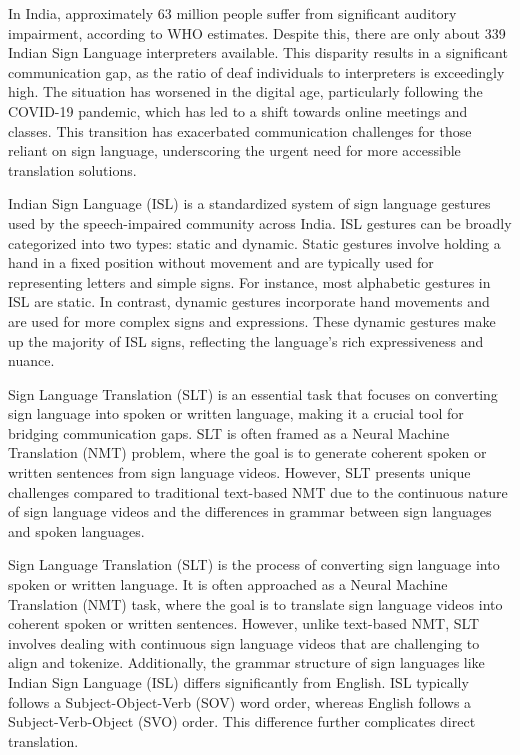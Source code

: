 \documentclass[conference]{IEEEtran}
\begin{document}
In India, approximately 63 million people suffer from significant auditory impairment, according to WHO estimates. Despite this, there are only about 339 Indian Sign Language interpreters available. This disparity results in a significant communication gap, as the ratio of deaf individuals to interpreters is exceedingly high. The situation has worsened in the digital age, particularly following the COVID-19 pandemic, which has led to a shift towards online meetings and classes. This transition has exacerbated communication challenges for those reliant on sign language, underscoring the urgent need for more accessible translation solutions.

Indian Sign Language (ISL) is a standardized system of sign language gestures used by the speech-impaired community across India. ISL gestures can be broadly categorized into two types: static and dynamic. Static gestures involve holding a hand in a fixed position without movement and are typically used for representing letters and simple signs. For instance, most alphabetic gestures in ISL are static. In contrast, dynamic gestures incorporate hand movements and are used for more complex signs and expressions. These dynamic gestures make up the majority of ISL signs, reflecting the language's rich expressiveness and nuance.

Sign Language Translation (SLT) is an essential task that focuses on converting sign language into spoken or written language, making it a crucial tool for bridging communication gaps. SLT is often framed as a Neural Machine Translation (NMT) problem, where the goal is to generate coherent spoken or written sentences from sign language videos. However, SLT presents unique challenges compared to traditional text-based NMT due to the continuous nature of sign language videos and the differences in grammar between sign languages and spoken languages.

Sign Language Translation (SLT) is the process of converting sign language into spoken or written language. It is often approached as a Neural Machine Translation (NMT) task, where the goal is to translate sign language videos into coherent spoken or written sentences. However, unlike text-based NMT, SLT involves dealing with continuous sign language videos that are challenging to align and tokenize. Additionally, the grammar structure of sign languages like Indian Sign Language (ISL) differs significantly from English. ISL typically follows a Subject-Object-Verb (SOV) word order, whereas English follows a Subject-Verb-Object (SVO) order. This difference further complicates direct translation.
\end{document}
